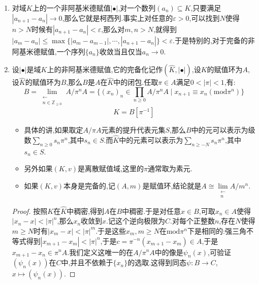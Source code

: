 \begin{enumerate}
\begin{proof}
    	只需证明如下命题:设$|x|=C^{-v(x)}$是域$K$上的离散赋值,其中$v(x)$取整数,对任意$x\in\widehat{K}^*$,存在整数$k$使得$|x|=C^k$.事实上设$\{x_n\}\subseteq K$收敛于$x$.按照$x\not=0$,不妨约定$x_n$中不含零元,那么$k_n=\ln|x_n|_p/\ln\mathrm{N}(p)$是$\mathbb{R}$上的柯西列.但是这是取值整数的柯西列,于是它收敛到一个整数$k$.
    \end{proof}
    \item 对域$K$上的一个非阿基米德赋值$|\bullet|$,对一个数列$(a_n)\subseteq K$,只要满足$|a_{n+1}-a_n|\to0$,那么它就是柯西列.事实上对任意的$\varepsilon>0$,可以找到$N$使得$n>N$时候有$|a_{n+1}-a_n|<\varepsilon$,那么对$m,n>N$,就得到$|a_m-a_n|\le\max\{|a_{m}-a_{m-1}|,\cdots,|a_{n+1}-a_n|\}<\varepsilon$.于是特别的,对于完备的非阿基米德赋值,一个序列$\{a_n\}$收敛当且仅当$a_n\to0$.
    \item 设$|\bullet|$是域$K$上的非阿基米德赋值,它的完备化记作$(\widehat{K},|\bullet|)$,设$K$的赋值环为$A$,设$\widehat{K}$的赋值环为$B$,那么$B$是$A$在$\widehat{K}$中的闭包.任取$\pi\in A$满足$0<|\pi|<1$,有:
    $$B=\lim\limits_{\substack{\leftarrow\\n\in\mathbb{Z}_{\ge0}}}A/\pi^nA=\{(x_n)_n\in\prod_{n\ge0}A/\pi^nA\mid x_{n+1}\equiv x_n(\mathrm{mod}\pi^n)\}$$
    $$K=B[\pi^{-1}]$$
    \begin{itemize}
    	\item 具体的讲,如果取定$A/\pi A$元素的提升代表元集$S$,那么$B$中的元可以表示为级数$\sum_{n\ge0}s_n\pi^n$,其中$s_n\in S$.而$\widehat{K}$中的元素可以表示为$\sum_{n\ge -N}s_n\pi^n$,其中$s_n\in S$.
    	\item 另外如果$(K,v)$是离散赋值域,这里的$\pi$通常取为素元.
    	\item 如果$(K,v)$本身是完备的,记$(A,m)$是赋值环,结论就是$A\cong\lim\limits_{\substack{\leftarrow\\n}}A/m^n$.
    \end{itemize}
    \begin{proof}
    	
    	按照$K$在$\widehat{K}$中稠密,得到$A$在$B$中稠密.于是对任意$x\in B$,可取$x_n\in A$使得$|x_n-x|<|\pi|^n$,那么$x_n$收敛到$x$.记这个逆向极限为$C$.对每个正整数$n$,存在$N$使得$m\ge N$时有$|x_m-x|<|\pi|^m$.于是这些$x_m,m\ge N$在$\mathrm{mod}\pi^n$下是相同的:强三角不等式得到$|x_{m+1}-x_m|<|\pi|^n$,于是$c=\pi^{-n}(x_{m+1}-x_m)\in A$,于是$x_{m+1}-x_n\in\pi^nA$.我们定义这唯一的在$A/\pi^nA$中的像是$\psi_n(x)$,可验证$(\psi_n(x))$在$C$中,并且不依赖于$\{x_n\}$的选取.这得到同态$\psi:B\to C$,$x\mapsto(\psi_n(x))$.
    	
    	\qquad
    	

\end{proof}
\end{enumerate}
